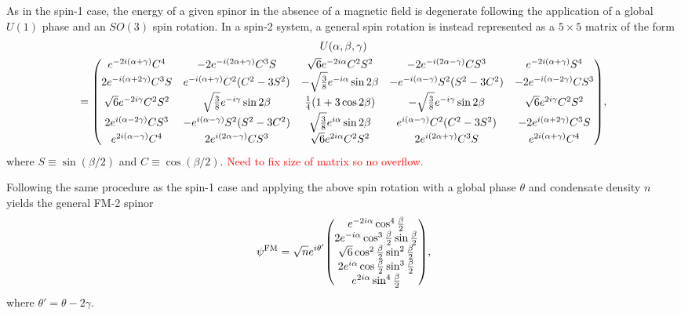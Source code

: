 As in the spin-1 case, the energy of a given spinor in the absence of a magnetic
field is degenerate following the application of a global \(U(1)\) phase and an
\(SO(3)\) spin rotation.
In a spin-2 system, a general spin rotation is instead represented as a
\(5\times 5\) matrix of the form
\begin{multline}   
    U(\alpha, \beta, \gamma) \\
     = \mqty(
        e^{-2i(\alpha + \gamma)}C^4 & -2e^{-i(2\alpha+\gamma)}C^3S 
        & \sqrt{6}e^{-2i\alpha}C^2S^2 & -2e^{-i(2\alpha-\gamma)}CS^3
        & e^{-2i(\alpha + \gamma)}S^4
        \\
        2e^{-i(\alpha+2\gamma)}C^3S & e^{-i(\alpha+\gamma)}C^2(C^2-3S^2)
        & -\sqrt{\frac{3}{8}}e^{-i\alpha}\sin 2\beta
        & -e^{-i(\alpha-\gamma)}S^2(S^2-3C^2) & -2e^{-i(\alpha-2\gamma)}CS^3
        \\
        \sqrt{6}e^{-2i\gamma}C^2S^2 & \sqrt{\frac{3}{8}}e^{-i\gamma}\sin 2\beta
        & \frac{1}{4}(1+3\cos 2\beta)
        & -\sqrt{\frac{3}{8}}e^{-i\gamma}\sin 2\beta
        & \sqrt{6}e^{2i\gamma}C^2S^2
        \\
        2e^{i(\alpha-2\gamma)}CS^3 & -e^{i(\alpha-\gamma)}S^2(S^2-3C^2)
        & \sqrt{\frac{3}{8}}e^{i\alpha}\sin 2\beta
        & e^{i(\alpha-\gamma)}C^2(C^2-3S^2) & -2e^{i(\alpha+2\gamma)}C^3S
        \\
        e^{2i(\alpha - \gamma)}C^4 & 2e^{i(2\alpha-\gamma)}CS^3 
        & \sqrt{6}e^{2i\alpha}C^2S^2 & 2e^{i(2\alpha+\gamma)}C^3S
        & e^{2i(\alpha + \gamma)}C^4
    ),
\end{multline}
where \(S \equiv \sin(\beta/2)\) and \(C \equiv \cos(\beta/2)\).
\textcolor{red}{Need to fix size of matrix so no overflow.}

Following the same procedure as the spin-1 case and applying the above spin
rotation with a global phase \(\theta \) and condensate density \(n\) yields the
general FM-2 spinor
\begin{equation}
    \psi^\mathrm{FM} = \sqrt{n}e^{i\theta'}\mqty(
        e^{-2i\alpha} \cos^4\frac{\beta}{2} \\
        2e^{-i\alpha}\cos^3\frac{\beta}{2}\sin \frac{\beta}{2} \\
        \sqrt{6} \cos^2\frac{\beta}{2} \sin^2\frac{\beta}{2} \\
        2e^{i\alpha}\cos\frac{\beta}{2} \sin^3\frac{\beta}{2} \\
        e^{2i\alpha} \sin^4\frac{\beta}{2}
    ),
\end{equation}
where \(\theta'=\theta-2\gamma \).

